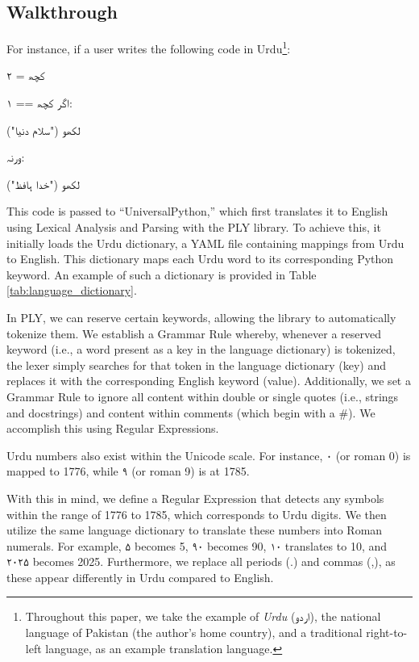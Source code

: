 \documentclass[conference]{IEEEtran}
\begin{document}
\subsection{Walkthrough}

For instance, if a user writes the following code in Urdu\footnote{Throughout this paper, we take the example of \textit{Urdu} (\texturdu{اردو}), the national language of Pakistan (the author's home country), and a traditional right-to-left language, as an example translation language.}:

\begin{urdu} %
\urdufont 
کچھ = ۲

اگر کچھ == ۱:

\quad لکھو ("سلام دنیا")

ورنہ:

\quad لکھو ("خدا ہافظ")

\end{urdu} %

This code is passed to “UniversalPython,” which first translates it to English using Lexical Analysis and Parsing with the PLY library. To achieve this, it initially loads the Urdu dictionary, a YAML file containing mappings from Urdu to English. This dictionary maps each Urdu word to its corresponding Python keyword. An example of such a dictionary is provided in Table \ref{tab:language_dictionary}. 

In PLY, we can reserve certain keywords, allowing the library to automatically tokenize them. We establish a Grammar Rule whereby, whenever a reserved keyword (i.e., a word present as a key in the language dictionary) is tokenized, the lexer simply searches for that token in the language dictionary (key) and replaces it with the corresponding English keyword (value). Additionally, we set a Grammar Rule to ignore all content within double or single quotes (i.e., strings and docstrings) and content within comments (which begin with a \#). We accomplish this using Regular Expressions.

Urdu numbers also exist within the Unicode scale. For instance, \texturdu{۰} (or roman 0) is mapped to 1776, while \texturdu{۹} (or roman 9) is at 1785. 

With this in mind, we define a Regular Expression that detects any symbols within the range of 1776 to 1785, which corresponds to Urdu digits. We then utilize the same language dictionary to translate these numbers into Roman numerals. For example, \texturdu{۵} becomes 5, \texturdu{۹۰} becomes 90, \texturdu{۱۰} translates to 10, and \texturdu{۲۰۲۵} becomes 2025. Furthermore, we replace all periods (.) and commas (,), as these appear differently in Urdu compared to English.
\end{document}
